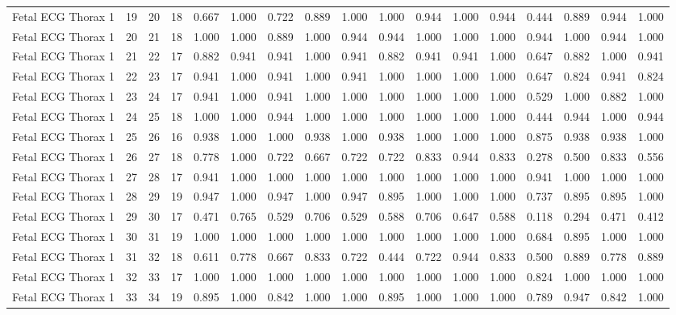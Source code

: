 \begin{longtable}{lllllllllllllllll}
Fetal ECG Thorax 1 & 19 & 20 & 18 & 0.667 & 1.000 & 0.722 & 0.889 & 1.000 & 1.000 & 0.944 & 1.000 & 0.944 & 0.444 & 0.889 & 0.944 & 1.000 \\
Fetal ECG Thorax 1 & 20 & 21 & 18 & 1.000 & 1.000 & 0.889 & 1.000 & 0.944 & 0.944 & 1.000 & 1.000 & 1.000 & 0.944 & 1.000 & 0.944 & 1.000 \\
Fetal ECG Thorax 1 & 21 & 22 & 17 & 0.882 & 0.941 & 0.941 & 1.000 & 0.941 & 0.882 & 0.941 & 0.941 & 1.000 & 0.647 & 0.882 & 1.000 & 0.941 \\
Fetal ECG Thorax 1 & 22 & 23 & 17 & 0.941 & 1.000 & 0.941 & 1.000 & 0.941 & 1.000 & 1.000 & 1.000 & 1.000 & 0.647 & 0.824 & 0.941 & 0.824 \\
Fetal ECG Thorax 1 & 23 & 24 & 17 & 0.941 & 1.000 & 0.941 & 1.000 & 1.000 & 1.000 & 1.000 & 1.000 & 1.000 & 0.529 & 1.000 & 0.882 & 1.000 \\
Fetal ECG Thorax 1 & 24 & 25 & 18 & 1.000 & 1.000 & 0.944 & 1.000 & 1.000 & 1.000 & 1.000 & 1.000 & 1.000 & 0.444 & 0.944 & 1.000 & 0.944 \\
Fetal ECG Thorax 1 & 25 & 26 & 16 & 0.938 & 1.000 & 1.000 & 0.938 & 1.000 & 0.938 & 1.000 & 1.000 & 1.000 & 0.875 & 0.938 & 0.938 & 1.000 \\
Fetal ECG Thorax 1 & 26 & 27 & 18 & 0.778 & 1.000 & 0.722 & 0.667 & 0.722 & 0.722 & 0.833 & 0.944 & 0.833 & 0.278 & 0.500 & 0.833 & 0.556 \\
Fetal ECG Thorax 1 & 27 & 28 & 17 & 0.941 & 1.000 & 1.000 & 1.000 & 1.000 & 1.000 & 1.000 & 1.000 & 1.000 & 0.941 & 1.000 & 1.000 & 1.000 \\
Fetal ECG Thorax 1 & 28 & 29 & 19 & 0.947 & 1.000 & 0.947 & 1.000 & 0.947 & 0.895 & 1.000 & 1.000 & 1.000 & 0.737 & 0.895 & 0.895 & 1.000 \\
Fetal ECG Thorax 1 & 29 & 30 & 17 & 0.471 & 0.765 & 0.529 & 0.706 & 0.529 & 0.588 & 0.706 & 0.647 & 0.588 & 0.118 & 0.294 & 0.471 & 0.412 \\
Fetal ECG Thorax 1 & 30 & 31 & 19 & 1.000 & 1.000 & 1.000 & 1.000 & 1.000 & 1.000 & 1.000 & 1.000 & 1.000 & 0.684 & 0.895 & 1.000 & 1.000 \\
Fetal ECG Thorax 1 & 31 & 32 & 18 & 0.611 & 0.778 & 0.667 & 0.833 & 0.722 & 0.444 & 0.722 & 0.944 & 0.833 & 0.500 & 0.889 & 0.778 & 0.889 \\
Fetal ECG Thorax 1 & 32 & 33 & 17 & 1.000 & 1.000 & 1.000 & 1.000 & 1.000 & 1.000 & 1.000 & 1.000 & 1.000 & 0.824 & 1.000 & 1.000 & 1.000 \\
Fetal ECG Thorax 1 & 33 & 34 & 19 & 0.895 & 1.000 & 0.842 & 1.000 & 1.000 & 0.895 & 1.000 & 1.000 & 1.000 & 0.789 & 0.947 & 0.842 & 1.000 \\

\end{longtable}
